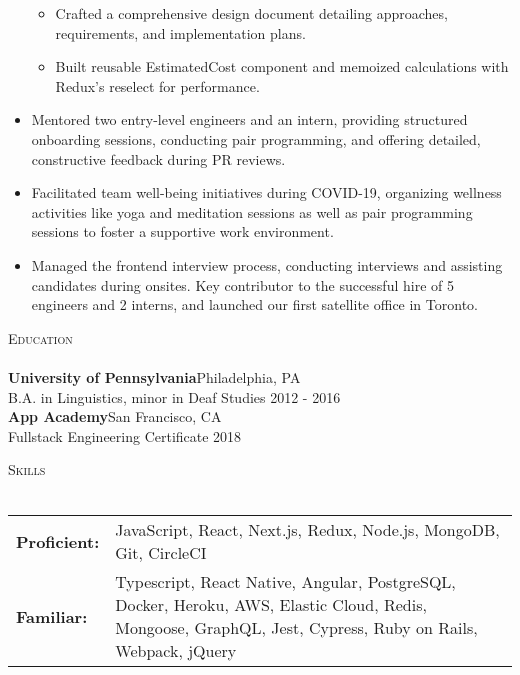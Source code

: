 \documentclass[a4paper]{article}
\newcommand{\header} [1] {
    {\hspace*{-18pt}\vspace*{3pt} \textcolor{deeppurple}{\textsc{#1}}}
    \vspace*{-12pt} \\
    \hspace*{-18pt} \textcolor{deeppurple}{\hrulefill} \\
}
\begin{document}
\begin{itemize}
\begin{itemize}
            \item Crafted a comprehensive design document detailing approaches, requirements, and implementation plans.
            \item Built reusable EstimatedCost component and memoized calculations with Redux's reselect for performance.
        \end{itemize}
    \item Mentored two entry-level engineers and an intern, providing structured onboarding sessions, conducting pair programming, and offering detailed, constructive feedback during PR reviews.
    \item Facilitated team well-being initiatives during COVID-19, organizing wellness activities like yoga and meditation sessions as well as pair programming sessions to foster a supportive work environment.
    \item Managed the frontend interview process, conducting interviews and assisting candidates during onsites. Key contributor to the successful hire of 5 engineers and 2 interns, and launched our first satellite office in Toronto.
\end{itemize}

\header{Education}
\textbf{University of Pennsylvania}\hfill Philadelphia, PA\\
B.A. in Linguistics, minor in Deaf Studies \hfill 2012 - 2016\\
\vspace{2mm}
\textbf{App Academy}\hfill San Francisco, CA\\
Fullstack Engineering Certificate \hfill 2018\\
\vspace{2mm}

\header{Skills}
\vspace{1mm}
\begin{tabular}{ l p{5.2in} }
    \textbf{Proficient:} & JavaScript, React, Next.js, Redux, Node.js, MongoDB, Git, CircleCI \\
    \textbf{Familiar:}   & Typescript, React Native, Angular, PostgreSQL, Docker, Heroku, AWS, Elastic Cloud, Redis, Mongoose, GraphQL, Jest, Cypress, Ruby on Rails, Webpack, jQuery \\
\end{tabular}
\end{document}
